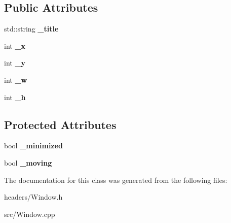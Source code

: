 \subsection*{Public Attributes}
\begin{DoxyCompactItemize}
\item 
\hypertarget{class_window_a5d4096105823af83ad842d52f297aa38}{}\label{class_window_a5d4096105823af83ad842d52f297aa38} 
std\+::string {\bfseries \+\_\+title}
\item 
\hypertarget{class_window_af907a6d65dbddffb8e58e162e22472e3}{}\label{class_window_af907a6d65dbddffb8e58e162e22472e3} 
int {\bfseries \+\_\+x}
\item 
\hypertarget{class_window_a40112a204e3a41a989ab7d4d55107390}{}\label{class_window_a40112a204e3a41a989ab7d4d55107390} 
int {\bfseries \+\_\+y}
\item 
\hypertarget{class_window_a7b1f17770125610dd478a0e68072d3da}{}\label{class_window_a7b1f17770125610dd478a0e68072d3da} 
int {\bfseries \+\_\+w}
\item 
\hypertarget{class_window_aab287f182e3d0db85341995ad1375b71}{}\label{class_window_aab287f182e3d0db85341995ad1375b71} 
int {\bfseries \+\_\+h}
\end{DoxyCompactItemize}
\subsection*{Protected Attributes}
\begin{DoxyCompactItemize}
\item 
\hypertarget{class_window_a740438df63489d2c93b3c6eb65da8e94}{}\label{class_window_a740438df63489d2c93b3c6eb65da8e94} 
bool {\bfseries \+\_\+minimized}
\item 
\hypertarget{class_window_a7b3113c737ef37d82ff2d18f3fb82f59}{}\label{class_window_a7b3113c737ef37d82ff2d18f3fb82f59} 
bool {\bfseries \+\_\+moving}
\end{DoxyCompactItemize}


The documentation for this class was generated from the following files\+:\begin{DoxyCompactItemize}
\item 
headers/Window.\+h\item 
src/Window.\+cpp\end{DoxyCompactItemize}
